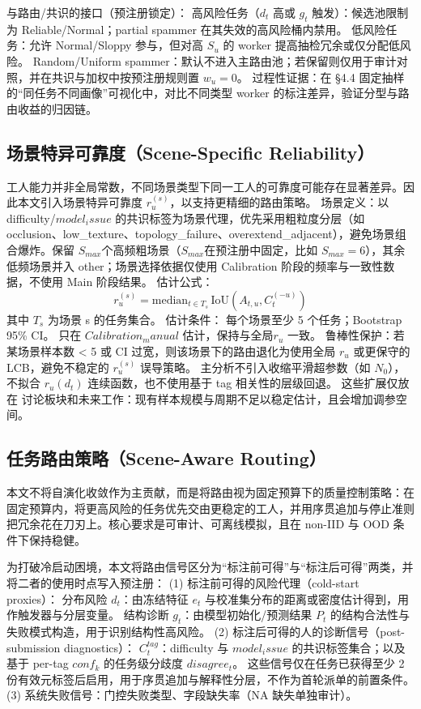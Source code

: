 \documentclass[journal,onecolumn]{IEEEtran}
\begin{document}
与路由/共识的接口（预注册锁定）：
高风险任务（$d_t$ 高或 $g_t$ 触发）：候选池限制为 Reliable/Normal；partial spammer 在其失效的高风险桶内禁用。
低风险任务：允许 Normal/Sloppy 参与，但对高 $S_u$ 的 worker 提高抽检冗余或仅分配低风险。
Random/Uniform spammer：默认不进入主路由池；若保留则仅用于审计对照，并在共识与加权中按预注册规则置 $w_u=0$。
过程性证据：在 §4.4 固定抽样的“同任务不同画像”可视化中，对比不同类型 worker 的标注差异，验证分型与路由收益的归因链。
\subsection{场景特异可靠度（Scene-Specific Reliability）}

工人能力并非全局常数，不同场景类型下同一工人的可靠度可能存在显著差异。因此本文引入场景特异可靠度 $r_u^{\left(s\right)}$，以支持更精细的路由策略。
场景定义：以 difficulty/$model_issue$ 的共识标签为场景代理，优先采用粗粒度分层（如 occlusion、low_texture、topology_failure、overextend_adjacent），避免场景组合爆炸。保留 $S_{max}$个高频粗场景（$S_{max}$在预注册中固定，比如 $S_{max}=6$），其余低频场景并入 other；场景选择依据仅使用 Calibration 阶段的频率与一致性数据，不使用 Main 阶段结果。
估计公式：
\[r_u^{\left(s\right)}=\mathrm{median}_{t\in T_s}\,\mathrm{IoU}\left(A_{t,u},C_t^{\left(-u\right)}\right)\]
其中 $T_s$ 为场景 s 的任务集合。
估计条件：
每个场景至少 5 个任务；Bootstrap 95\% CI。
只在 $Calibration_manual$ 估计，保持与全局$r_u$ 一致。
鲁棒性保护：若某场景样本数 < 5 或 CI 过宽，则该场景下的路由退化为使用全局 $r_u$ 或更保守的 LCB，避免不稳定的 $r_u^{\left(s\right)}$ 误导策略。
主分析不引入收缩平滑超参数（如 $N_0$），不拟合 $r_u\left(d_t\right)$ 连续函数，也不使用基于 tag 相关性的层级回退。
这些扩展仅放在 讨论板块和未来工作：现有样本规模与周期不足以稳定估计，且会增加调参空间。

\subsection{任务路由策略（Scene-Aware Routing）}

本文不将自演化收敛作为主贡献，而是将路由视为固定预算下的质量控制策略：在固定预算内，将更高风险的任务优先交由更稳定的工人，并用序贯追加与停止准则把冗余花在刀刃上。核心要求是可审计、可离线模拟，且在 non-IID 与 OOD 条件下保持稳健。

为打破冷启动困境，本文将路由信号区分为“标注前可得”与“标注后可得”两类，并将二者的使用时点写入预注册：
(1) 标注前可得的风险代理（cold-start proxies）：
分布风险 $d_t$：由冻结特征 $e_t$ 与校准集分布的距离或密度估计得到，用作触发器与分层变量。
结构诊断 $g_t$：由模型初始化/预测结果 $P_t$ 的结构合法性与失败模式构造，用于识别结构性高风险。
(2) 标注后可得的人的诊断信号（post-submission diagnostics）：
$C_t^{tag}$：difficulty 与 $model_issue$ 的共识标签集合；以及基于 per-tag $conf_k$ 的任务级分歧度 $disagree_t$。
这些信号仅在任务已获得至少 2 份有效元标签后启用，用于序贯追加与解释性分层，不作为首轮派单的前置条件。
(3) 系统失败信号：门控失败类型、字段缺失率（NA 缺失单独审计）。
\end{document}
